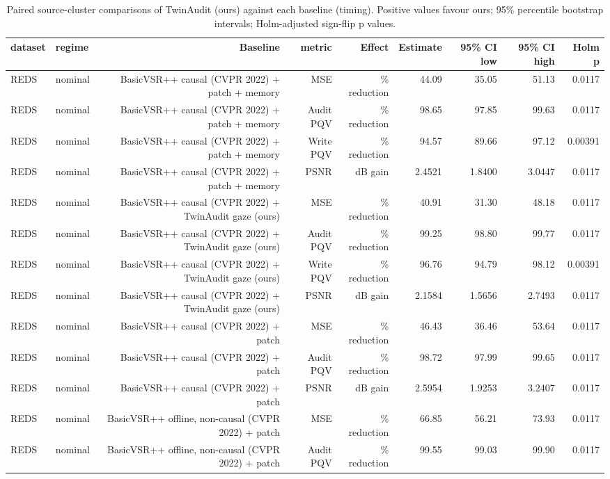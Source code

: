 \begin{table}[t]
\centering
\caption{Paired source-cluster comparisons of TwinAudit (ours) against each baseline (timing). Positive values favour ours; 95\% percentile bootstrap intervals; Holm-adjusted sign-flip p values.}
\label{tab:paired_timing}
\small
\begin{tabular}{llrrrrrrr}
\toprule
dataset & regime & Baseline & metric & Effect & Estimate & 95\% CI low & 95\% CI high & Holm p \\
\midrule
REDS & nominal & BasicVSR++ causal (CVPR 2022) + patch + memory & MSE & \% reduction & 44.09 & 35.05 & 51.13 & 0.0117 \\
REDS & nominal & BasicVSR++ causal (CVPR 2022) + patch + memory & Audit PQV & \% reduction & 98.65 & 97.85 & 99.63 & 0.0117 \\
REDS & nominal & BasicVSR++ causal (CVPR 2022) + patch + memory & Write PQV & \% reduction & 94.57 & 89.66 & 97.12 & 0.00391 \\
REDS & nominal & BasicVSR++ causal (CVPR 2022) + patch + memory & PSNR & dB gain & 2.4521 & 1.8400 & 3.0447 & 0.0117 \\
REDS & nominal & BasicVSR++ causal (CVPR 2022) + TwinAudit gaze (ours) & MSE & \% reduction & 40.91 & 31.30 & 48.18 & 0.0117 \\
REDS & nominal & BasicVSR++ causal (CVPR 2022) + TwinAudit gaze (ours) & Audit PQV & \% reduction & 99.25 & 98.80 & 99.77 & 0.0117 \\
REDS & nominal & BasicVSR++ causal (CVPR 2022) + TwinAudit gaze (ours) & Write PQV & \% reduction & 96.76 & 94.79 & 98.12 & 0.00391 \\
REDS & nominal & BasicVSR++ causal (CVPR 2022) + TwinAudit gaze (ours) & PSNR & dB gain & 2.1584 & 1.5656 & 2.7493 & 0.0117 \\
REDS & nominal & BasicVSR++ causal (CVPR 2022) + patch & MSE & \% reduction & 46.43 & 36.46 & 53.64 & 0.0117 \\
REDS & nominal & BasicVSR++ causal (CVPR 2022) + patch & Audit PQV & \% reduction & 98.72 & 97.99 & 99.65 & 0.0117 \\
REDS & nominal & BasicVSR++ causal (CVPR 2022) + patch & PSNR & dB gain & 2.5954 & 1.9253 & 3.2407 & 0.0117 \\
REDS & nominal & BasicVSR++ offline, non-causal (CVPR 2022) + patch & MSE & \% reduction & 66.85 & 56.21 & 73.93 & 0.0117 \\
REDS & nominal & BasicVSR++ offline, non-causal (CVPR 2022) + patch & Audit PQV & \% reduction & 99.55 & 99.03 & 99.90 & 0.0117 \\

\end{tabular}
\end{table}
